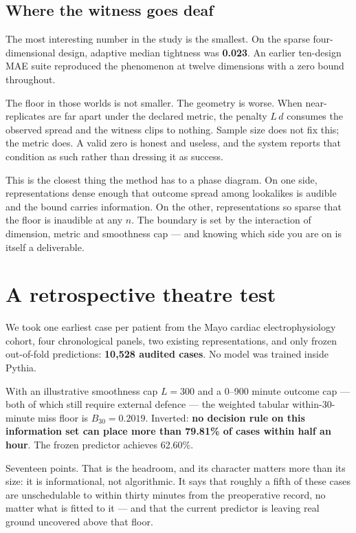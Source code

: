 \documentclass[11pt,a4paper]{article}
\begin{document}
\subsection{Where the witness goes deaf}

The most interesting number in the study is the smallest. On the sparse four-dimensional design, adaptive median tightness was \textbf{0.023}. An earlier ten-design MAE suite reproduced the phenomenon at twelve dimensions with a zero bound throughout.

The floor in those worlds is not smaller. The geometry is worse. When near-replicates are far apart under the declared metric, the penalty $L\,d$ consumes the observed spread and the witness clips to nothing. Sample size does not fix this; the metric does. A valid zero is honest and useless, and the system reports that condition as such rather than dressing it as success.

This is the closest thing the method has to a phase diagram. On one side, representations dense enough that outcome spread among lookalikes is audible and the bound carries information. On the other, representations so sparse that the floor is inaudible at any $n$. The boundary is set by the interaction of dimension, metric and smoothness cap --- and knowing which side you are on is itself a deliverable.

\section{A retrospective theatre test}

We took one earliest case per patient from the Mayo cardiac electrophysiology cohort, four chronological panels, two existing representations, and only frozen out-of-fold predictions: \textbf{10{,}528 audited cases}. No model was trained inside Pythia.

With an illustrative smoothness cap $L=300$ and a 0--900 minute outcome cap --- both of which still require external defence --- the weighted tabular within-30-minute miss floor is $B_{30}=0.2019$. Inverted: \textbf{no decision rule on this information set can place more than 79.81\% of cases within half an hour}. The frozen predictor achieves 62.60\%.

Seventeen points. That is the headroom, and its character matters more than its size: it is informational, not algorithmic. It says that roughly a fifth of these cases are unschedulable to within thirty minutes from the preoperative record, no matter what is fitted to it --- and that the current predictor is leaving real ground uncovered above that floor.
\end{document}
